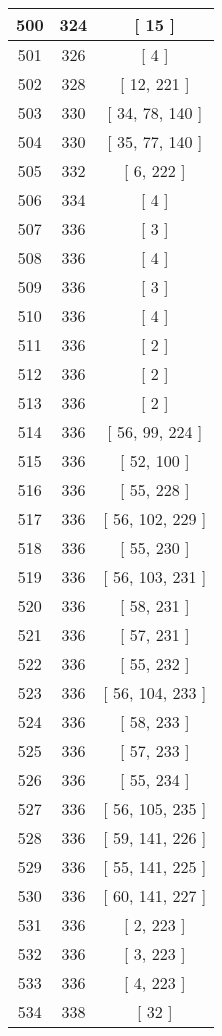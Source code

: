 \begin{center}
\begin{longtable}[H]{|| c c c ||}
\hline
500 & 324 & [ 15 ] \\ 
\hline
501 & 326 & [ 4 ] \\ 
\hline
502 & 328 & [ 12, 221 ] \\ 
\hline
503 & 330 & [ 34, 78, 140 ] \\ 
\hline
504 & 330 & [ 35, 77, 140 ] \\ 
\hline
505 & 332 & [ 6, 222 ] \\ 
\hline
506 & 334 & [ 4 ] \\ 
\hline
507 & 336 & [ 3 ] \\ 
\hline
508 & 336 & [ 4 ] \\ 
\hline
509 & 336 & [ 3 ] \\ 
\hline
510 & 336 & [ 4 ] \\ 
\hline
511 & 336 & [ 2 ] \\ 
\hline
512 & 336 & [ 2 ] \\ 
\hline
513 & 336 & [ 2 ] \\ 
\hline
514 & 336 & [ 56, 99, 224 ] \\ 
\hline
515 & 336 & [ 52, 100 ] \\ 
\hline
516 & 336 & [ 55, 228 ] \\ 
\hline
517 & 336 & [ 56, 102, 229 ] \\ 
\hline
518 & 336 & [ 55, 230 ] \\ 
\hline
519 & 336 & [ 56, 103, 231 ] \\ 
\hline
520 & 336 & [ 58, 231 ] \\ 
\hline
521 & 336 & [ 57, 231 ] \\ 
\hline
522 & 336 & [ 55, 232 ] \\ 
\hline
523 & 336 & [ 56, 104, 233 ] \\ 
\hline
524 & 336 & [ 58, 233 ] \\ 
\hline
525 & 336 & [ 57, 233 ] \\ 
\hline
526 & 336 & [ 55, 234 ] \\ 
\hline
527 & 336 & [ 56, 105, 235 ] \\ 
\hline
528 & 336 & [ 59, 141, 226 ] \\ 
\hline
529 & 336 & [ 55, 141, 225 ] \\ 
\hline
530 & 336 & [ 60, 141, 227 ] \\ 
\hline
531 & 336 & [ 2, 223 ] \\ 
\hline
532 & 336 & [ 3, 223 ] \\ 
\hline
533 & 336 & [ 4, 223 ] \\ 
\hline
534 & 338 & [ 32 ] \\ 

\end{longtable}
\end{center}
